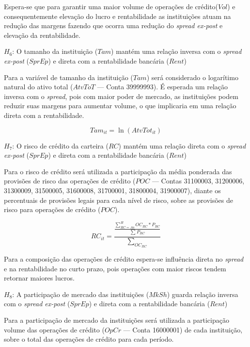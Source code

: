 \documentclass[
  12pt,
  12pt,
  openright,
  oneside,
  a4paper,
  chapter=TITLE,
  section=TITLE,
  subsection=TITLE,
  subsubsection=TITLE,
  english,
  portugues,
  sumario=tradicional]{abntex2}
\begin{document}
Espera-se que para garantir uma maior volume de operações de crédito(\(Vol\)) e consequentemente elevação do lucro e rentabilidade as instituições atuam na redução das margens fazendo que ocorra uma redução do \emph{spread ex-post} e elevação da rentabilidade.

\(H_{6}\): O tamanho da instituição (\(Tam\)) mantém uma relação inversa com o \emph{spread ex-post} (\(SprEp\)) e direta com a rentabilidade bancária (\(Rent\))

Para a variável de tamanho da instituição (\(Tam\)) será considerado o logarítimo natural do ativo total (\(AtvToT\) --- Conta 39999993). É esperada um relação inversa com o \emph{spread}, pois com maior poder de mercado, as instituições podem reduzir suas margens para aumentar volume, o que implicaria em uma relação direta com a rentabilidade.

\begin{equation}
Tam_{it} = \ln(AtvTot_{it})
\end{equation}

\(H_{7}\): O risco de crédito da carteira (\(RC\)) mantém uma relação direta com o \emph{spread ex-post} (\(SprEp\)) e direta com a rentabilidade bancária (\(Rent\))

Para o risco de crédito será utilizada a participação da média ponderada das provisões de risco das operações de crédito (\(POC\) --- Contas 31100003, 31200006, 31300009, 31500005, 31600008, 31700001, 31800004, 31900007), diante os percentuais de provisões legais para cada nível de risco, sobre as provisões de risco para operações de crédito (\(POC\)).

\begin{equation}
RC_{it} = \frac{\frac{\sum_{RC = Aa}^HOC_{RC}*P_{RC}}{\sum_{}P_{RC}}}{\sum_{OC_{RC}}}
\end{equation}

Para a composição das operações de crédito espera-se influência direta no \emph{spread} e na rentabilidade no curto prazo, pois operações com maior riscos tendem retornar maiores lucros.

\(H_{8}\): A participação de mercado das instituições (\(MkSh\)) guarda relação inversa com o \emph{spread ex-post} (\(SprEp\)) e direta com a rentabilidade bancária (\(Rent\))

Para a participação de mercado da instituições será utilizada a participação volume das operações de crédito (\(OpCr\) --- Conta 16000001) de cada instituição, sobre o total das operações de crédito para cada período.
\end{document}
